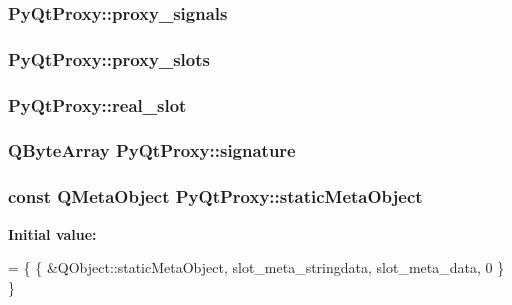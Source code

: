 \subsubsection[{proxy\+\_\+signals}]{ Py\+Qt\+Proxy\+::proxy\+\_\+signals\hspace{0.3cm}{\ttfamily [static]}}\label{classPyQtProxy_a6af53d28ba08271c82160e75c28741d2}
\hypertarget{classPyQtProxy_a7ee0c7402ddcba89534bf3b7d429d0a5}{}
\subsubsection[{proxy\+\_\+slots}]{ Py\+Qt\+Proxy\+::proxy\+\_\+slots\hspace{0.3cm}{\ttfamily [static]}}\label{classPyQtProxy_a7ee0c7402ddcba89534bf3b7d429d0a5}
\hypertarget{classPyQtProxy_a647b43db480108a317d80b2c4cc048d2}{}
\subsubsection[{real\+\_\+slot}]{ Py\+Qt\+Proxy\+::real\+\_\+slot}\label{classPyQtProxy_a647b43db480108a317d80b2c4cc048d2}
\hypertarget{classPyQtProxy_a403691e985724bd6fd5c4d1d82ee01d0}{}
\subsubsection[{signature}]{\setlength{\rightskip}{0pt plus 5cm}Q\+Byte\+Array Py\+Qt\+Proxy\+::signature}\label{classPyQtProxy_a403691e985724bd6fd5c4d1d82ee01d0}
\hypertarget{classPyQtProxy_aee9d4c3f3b85c59a12fc42c0c61c06bd}{}
\subsubsection[{static\+Meta\+Object}]{\setlength{\rightskip}{0pt plus 5cm}const Q\+Meta\+Object Py\+Qt\+Proxy\+::static\+Meta\+Object\hspace{0.3cm}{\ttfamily [static]}}\label{classPyQtProxy_aee9d4c3f3b85c59a12fc42c0c61c06bd}
{\bfseries Initial value\+:}
\begin{DoxyCode}
= \{
    \{
        &QObject::staticMetaObject,
        slot\_meta\_stringdata,
        slot\_meta\_data,
        0
    \}
\}
\end{DoxyCode}
\hypertarget{classPyQtProxy_a6f2c3c1d885dc60d5afbe791a4a9f3a1}{}
